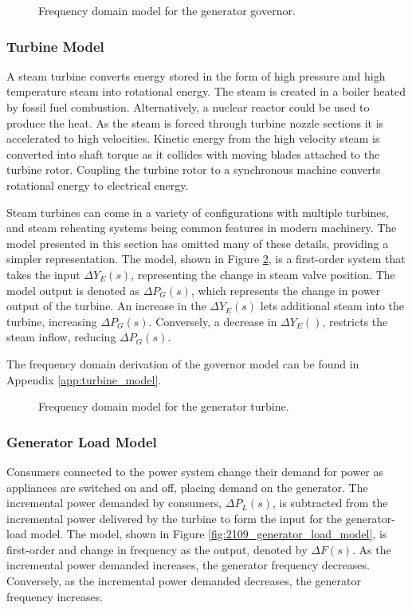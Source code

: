 \begin{figure}[h]
	\centering
	
	\caption[Frequency domain model for governor]{Frequency domain model for the generator governor.}
	\label{fig:2107_governor_model}
\end{figure}

\subsubsection{Turbine Model}
A steam turbine converts energy stored in the form of high pressure and high temperature steam into rotational energy. The steam is created in a boiler heated by fossil fuel combustion. Alternatively, a nuclear reactor could be used to produce the heat. As the steam is forced through turbine nozzle sections it is accelerated to high velocities. Kinetic energy from the high velocity steam is converted into shaft torque as it collides with moving blades attached to the turbine rotor. Coupling the turbine rotor to a synchronous machine converts rotational energy to electrical energy.

Steam turbines can come in a variety of configurations with multiple turbines, and steam reheating systems being common features in modern machinery. The model presented in this section has omitted many of these details, providing a simpler representation. The model, shown in Figure \ref{fig:2108_turbine_model}, is a first-order system that takes the input $\Delta Y_E(s)$, representing the change in steam valve position. The model output is denoted as $\Delta P_G(s)$, which represents the change in power output of the turbine. An increase in the $\Delta Y_E(s)$ lets additional steam into the turbine, increasing $\Delta P_G(s)$. Conversely, a decrease in $\Delta Y_E()$, restricts the steam inflow, reducing $\Delta P_G(s)$.

The frequency domain derivation of the governor model can be found in Appendix \ref{app:turbine_model}.

\begin{figure}[h]
	\centering
	
	\caption[Frequency domain model for governor]{Frequency domain model for the generator turbine.}
	\label{fig:2108_turbine_model}
\end{figure}

\subsubsection{Generator Load Model}
Consumers connected to the power system change their demand for power as appliances are switched on and off, placing demand on the generator. The incremental power demanded by consumers, $\Delta P_L(s)$, is subtracted from the incremental power delivered by the turbine to form the input for the generator-load model. The model, shown in Figure \ref{fig:2109_generator_load_model}, is first-order and change in frequency as the output, denoted by $\Delta F(s)$. As the incremental power demanded increases, the generator frequency decreases. Conversely, as the incremental power demanded decreases, the generator frequency increases.

